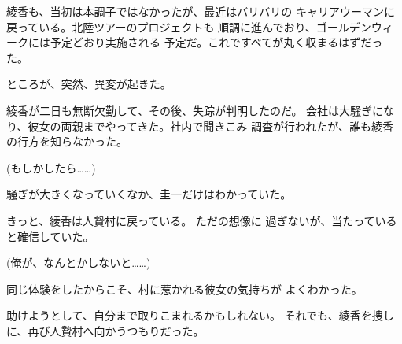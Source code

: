 ﻿\documentclass[
    book,tate,
    line_length=30zw,
    jafontsize=12pt,
    paper=b5j,
    landscape,
    ]{jlreq}
\begin{document}
綾香も、当初は本調子ではなかったが、最近はバリバリの
キャリアウーマンに戻っている。北陸ツアーのプロジェクトも
順調に進んでおり、ゴールデンウィークには予定どおり実施される
予定だ。これですべてが丸く収まるはずだった。

ところが、突然、異変が起きた。

綾香が二日も無断欠勤して、その後、失踪が判明したのだ。
会社は大騒ぎになり、彼女の両親までやってきた。社内で聞きこみ
調査が行われたが、誰も綾香の行方を知らなかった。

(もしかしたら……)

騒ぎが大きくなっていくなか、圭一だけはわかっていた。

きっと、綾香は人贄村に戻っている。 ただの想像に
過ぎないが、当たっていると確信していた。

(俺が、なんとかしないと……)

同じ体験をしたからこそ、村に惹かれる彼女の気持ちが
よくわかった。

助けようとして、自分まで取りこまれるかもしれない。
それでも、綾香を捜しに、再び人贄村へ向かうつもりだった。

\end{document}
